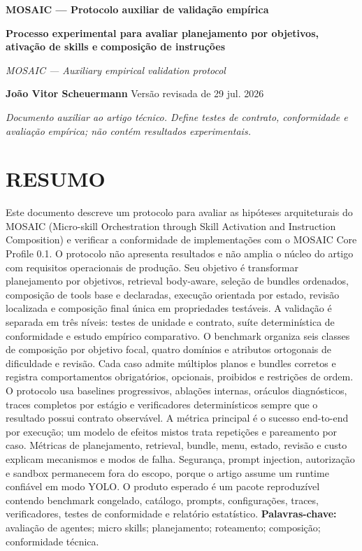 \documentclass[12pt,a4paper]{article}
\begin{document}
\begin{center}\textbf{MOSAIC — Protocolo auxiliar de validação empírica}\par\end{center}

\textbf{Processo experimental para avaliar planejamento por objetivos, ativação de skills e} \textbf{composição de instruções}


\textit{MOSAIC — Auxiliary empirical validation protocol}


\begin{center}\textbf{João Vitor Scheuermann} Versão revisada de 29 jul. 2026\end{center}

\textit{Documento auxiliar ao artigo técnico. Define testes de contrato, conformidade e avaliação} \textit{empírica; não contém resultados experimentais.}


\section*{RESUMO}

Este documento descreve um protocolo para avaliar as hipóteses arquiteturais do MOSAIC (Micro-skill Orchestration through Skill Activation and Instruction Composition) e verificar a conformidade de implementações com o MOSAIC Core Profile 0.1. O protocolo não apresenta resultados e não amplia o núcleo do artigo com requisitos operacionais de produção. Seu objetivo é transformar planejamento por objetivos, retrieval body-aware, seleção de bundles ordenados, composição de tools base e declaradas, execução orientada por estado, revisão localizada e composição final única em propriedades testáveis. A validação é separada em três níveis: testes de unidade e contrato, suíte determinística de conformidade e estudo empírico comparativo. O benchmark organiza seis classes de composição por objetivo focal, quatro domínios e atributos ortogonais de dificuldade e revisão. Cada caso admite múltiplos planos e bundles corretos e registra comportamentos obrigatórios, opcionais, proibidos e restrições de ordem. O protocolo usa baselines progressivos, ablações internas, oráculos diagnósticos, traces completos por estágio e verificadores determinísticos sempre que o resultado possui contrato observável. A métrica principal é o sucesso end-to-end por execução; um modelo de efeitos mistos trata repetições e pareamento por caso. Métricas de planejamento, retrieval, bundle, menu, estado, revisão e custo explicam mecanismos e modos de falha. Segurança, prompt injection, autorização e sandbox permanecem fora do escopo, porque o artigo assume um runtime confiável em modo YOLO. O produto esperado é um pacote reproduzível contendo benchmark congelado, catálogo, prompts, configurações, traces, verificadores, testes de conformidade e relatório estatístico. \textbf{Palavras-chave:} avaliação de agentes; micro skills; planejamento; roteamento; composição; conformidade técnica.
\end{document}
